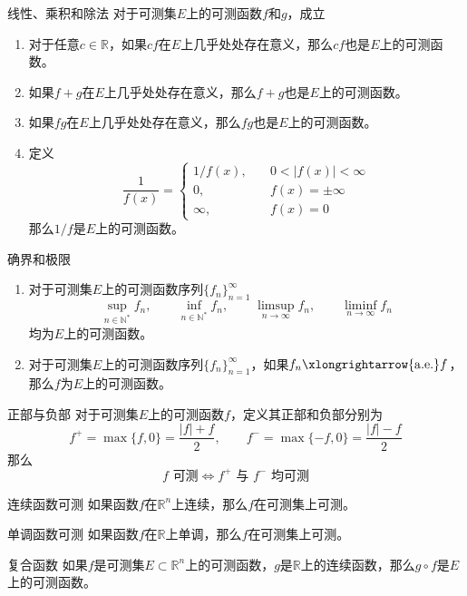 \documentclass[lang = cn, scheme = chinese, thmcnt = section]{elegantbook}
\newcommand{\N}{\mathbb{N}}            %
\newcommand{\R}{\mathbb{R}}            %
\newcommand{\sub}{\subset}             %
\newcommand{\toae}{\xlongrightarrow{\mathrm{a.e.}}}
\begin{document}
\begin{theorem}{线性、乘积和除法}
	对于可测集$E$上的可测函数$f$和$g$，成立
	\begin{enumerate}
		\item 对于任意$c\in\R$，如果$cf$在$E$上几乎处处存在意义，那么$cf$也是$E$上的可测函数。
		\item 如果$f+g$在$E$上几乎处处存在意义，那么$f+g$也是$E$上的可测函数。
		\item 如果$fg$在$E$上几乎处处存在意义，那么$fg$也是$E$上的可测函数。
		\item 定义
		$$
		\frac{1}{f(x)}=\begin{cases}
			1/f(x),\quad & 0<|f(x)|<\infty\\
			0,\quad & f(x)=\pm\infty\\
			\infty,\quad & f(x)=0
		\end{cases}
		$$
		那么$1/f$是$E$上的可测函数。
	\end{enumerate}
\end{theorem}

\begin{theorem}{确界和极限}
	\begin{enumerate}
		\item 对于可测集$E$上的可测函数序列$\{f_n\}_{n=1}^{\infty}$
		$$
		\sup_{n\in\N^*} f_n,\qquad \inf_{n\in\N^*} f_n,\qquad \limsup_{n\to\infty} f_n,\qquad \liminf_{n\to\infty} f_n
		$$
		均为$E$上的可测函数。
		\item 对于可测集$E$上的可测函数序列$\{f_n\}_{n=1}^{\infty}$，如果$f_n\toae f$，那么$f$为$E$上的可测函数。
	\end{enumerate}
\end{theorem}

\begin{theorem}{正部与负部}
	对于可测集$E$上的可测函数$f$，定义其正部和负部分别为
	$$
	f^+=\max\{f,0\}=\frac{|f|+f}{2},\qquad 
	f^-=\max\{-f,0\}=\frac{|f|-f}{2}
	$$
	那么
	$$
	f\text{ 可测}
	\iff
	f^+\text{ 与 }f^-\text{ 均可测}
	$$
\end{theorem}

\begin{theorem}{连续函数可测}
	如果函数$f$在$\R^n$上连续，那么$f$在可测集上可测。
\end{theorem}

\begin{theorem}{单调函数可测}
	如果函数$f$在$\R$上单调，那么$f$在可测集上可测。
\end{theorem}

\begin{theorem}{复合函数}
	如果$f$是可测集$E\sub\R^n$上的可测函数，$g$是$\R$上的连续函数，那么$g\circ f$是$E$上的可测函数。
\end{theorem}
\end{document}
